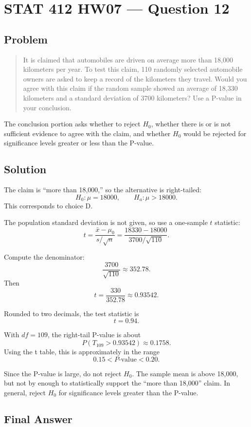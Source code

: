 \documentclass[11pt]{article}
\begin{document}
\section*{STAT 412 HW07 --- Question 12}

\subsection*{Problem}

\begin{quote}
It is claimed that automobiles are driven on average more than 18,000 kilometers per year. To test this claim, 110 randomly selected automobile owners are asked to keep a record of the kilometers they travel. Would you agree with this claim if the random sample showed an average of 18,330 kilometers and a standard deviation of 3700 kilometers? Use a P-value in your conclusion.
\end{quote}

The conclusion portion asks whether to reject $H_0$, whether there is or is not sufficient evidence to agree with the claim, and whether $H_0$ would be rejected for significance levels greater or less than the P-value.

\subsection*{Solution}

The claim is ``more than 18,000,'' so the alternative is right-tailed:
\[
H_0:\mu=18000,\qquad H_a:\mu>18000.
\]
This corresponds to choice D.

The population standard deviation is not given, so use a one-sample $t$ statistic:
\[
t=\frac{\bar{x}-\mu_0}{s/\sqrt{n}}
  =\frac{18330-18000}{3700/\sqrt{110}}.
\]

Compute the denominator:
\[
\frac{3700}{\sqrt{110}}\approx 352.78.
\]
Then
\[
t=\frac{330}{352.78}\approx 0.93542.
\]

Rounded to two decimals, the test statistic is
\[
t=0.94.
\]

With $df=109$, the right-tail P-value is about
\[
P(T_{109}>0.93542)\approx 0.1758.
\]
Using the t table, this is approximately in the range
\[
0.15<P\text{-value}<0.20.
\]

Since the P-value is large, do not reject $H_0$. The sample mean is above 18,000, but not by enough to statistically support the ``more than 18,000'' claim. In general, reject $H_0$ for significance levels greater than the P-value.

\subsection*{Final Answer}

\end{document}
